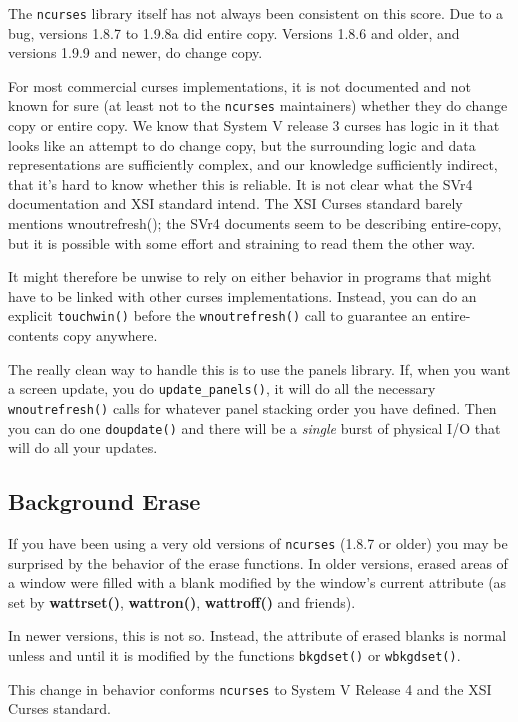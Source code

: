 The \texttt{ncurses} library itself has not always been consistent on this
score.  Due to a bug, versions 1.8.7 to 1.9.8a did entire copy.  Versions
1.8.6 and older, and versions 1.9.9 and newer, do change copy. 

For most commercial curses implementations, it is not documented and not known
for sure (at least not to the \texttt{ncurses} maintainers) whether they do
change copy or entire copy.  We know that System V release 3 curses has logic
in it that looks like an attempt to do change copy, but the surrounding logic
and data representations are sufficiently complex, and our knowledge
sufficiently indirect, that it's hard to know whether this is reliable.
It is not clear what the SVr4 documentation and XSI standard intend.  The XSI
Curses standard barely mentions wnoutrefresh(); the SVr4 documents seem to be
describing entire-copy, but it is possible with some effort and straining to
read them the other way. 

It might therefore be unwise to rely on either behavior in programs that might
have to be linked with other curses implementations.  Instead, you can do an
explicit \texttt{touchwin()} before the \texttt{wnoutrefresh()} call to
guarantee an entire-contents copy anywhere. 

The really clean way to handle this is to use the panels library.  If,
when you want a screen update, you do \texttt{update\_panels()}, it will
do all the necessary \texttt{wnoutrefresh()} calls for whatever panel
stacking order you have defined.  Then you can do one \texttt{doupdate()}
and there will be a \emph{single} burst of physical I/O that will do
all your updates.

\subsection{Background Erase}

\label{f0:backbug}If you have been using a very old versions of \texttt{ncurses} (1.8.7 or
older) you may be surprised by the behavior of the erase functions.  In older
versions, erased areas of a window were filled with a blank modified by the
window's current attribute (as set by \textbf{wattrset()}, \textbf{wattron()},
\textbf{wattroff()} and friends). 

In newer versions, this is not so.  Instead, the attribute of erased blanks
is normal unless and until it is modified by the functions \texttt{bkgdset()}
or \texttt{wbkgdset()}. 

This change in behavior conforms \texttt{ncurses} to System V Release 4 and
the XSI Curses standard.

